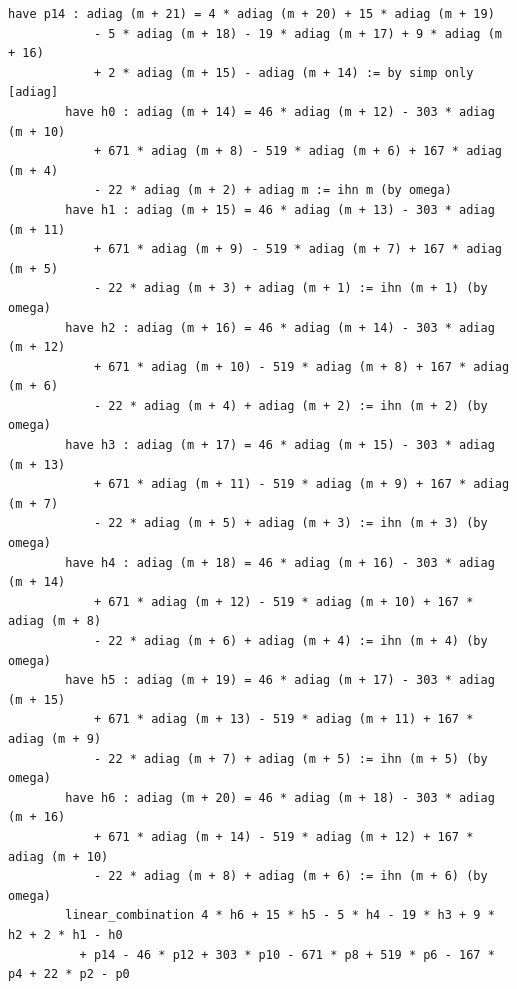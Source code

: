 \documentclass[11pt]{article}
\theoremstyle{definition}
\begin{document}
\begin{lstlisting}[caption={Inductive step of the auxiliary lemma
\texttt{lifted}: the last unfolding \texttt{p14}, the seven induction
hypotheses \texttt{h0}--\texttt{h6} and the closing
\texttt{linear\_combination}, verbatim excerpt from
\texttt{final/01-comb07-diagnotch-proved.lean} (lines 147--172, sha256
\texttt{51721e9e}).},label={lst:t1close}]
        have p14 : adiag (m + 21) = 4 * adiag (m + 20) + 15 * adiag (m + 19)
            - 5 * adiag (m + 18) - 19 * adiag (m + 17) + 9 * adiag (m + 16)
            + 2 * adiag (m + 15) - adiag (m + 14) := by simp only [adiag]
        have h0 : adiag (m + 14) = 46 * adiag (m + 12) - 303 * adiag (m + 10)
            + 671 * adiag (m + 8) - 519 * adiag (m + 6) + 167 * adiag (m + 4)
            - 22 * adiag (m + 2) + adiag m := ihn m (by omega)
        have h1 : adiag (m + 15) = 46 * adiag (m + 13) - 303 * adiag (m + 11)
            + 671 * adiag (m + 9) - 519 * adiag (m + 7) + 167 * adiag (m + 5)
            - 22 * adiag (m + 3) + adiag (m + 1) := ihn (m + 1) (by omega)
        have h2 : adiag (m + 16) = 46 * adiag (m + 14) - 303 * adiag (m + 12)
            + 671 * adiag (m + 10) - 519 * adiag (m + 8) + 167 * adiag (m + 6)
            - 22 * adiag (m + 4) + adiag (m + 2) := ihn (m + 2) (by omega)
        have h3 : adiag (m + 17) = 46 * adiag (m + 15) - 303 * adiag (m + 13)
            + 671 * adiag (m + 11) - 519 * adiag (m + 9) + 167 * adiag (m + 7)
            - 22 * adiag (m + 5) + adiag (m + 3) := ihn (m + 3) (by omega)
        have h4 : adiag (m + 18) = 46 * adiag (m + 16) - 303 * adiag (m + 14)
            + 671 * adiag (m + 12) - 519 * adiag (m + 10) + 167 * adiag (m + 8)
            - 22 * adiag (m + 6) + adiag (m + 4) := ihn (m + 4) (by omega)
        have h5 : adiag (m + 19) = 46 * adiag (m + 17) - 303 * adiag (m + 15)
            + 671 * adiag (m + 13) - 519 * adiag (m + 11) + 167 * adiag (m + 9)
            - 22 * adiag (m + 7) + adiag (m + 5) := ihn (m + 5) (by omega)
        have h6 : adiag (m + 20) = 46 * adiag (m + 18) - 303 * adiag (m + 16)
            + 671 * adiag (m + 14) - 519 * adiag (m + 12) + 167 * adiag (m + 10)
            - 22 * adiag (m + 8) + adiag (m + 6) := ihn (m + 6) (by omega)
        linear_combination 4 * h6 + 15 * h5 - 5 * h4 - 19 * h3 + 9 * h2 + 2 * h1 - h0
          + p14 - 46 * p12 + 303 * p10 - 671 * p8 + 519 * p6 - 167 * p4 + 22 * p2 - p0
\end{lstlisting}
\end{document}
